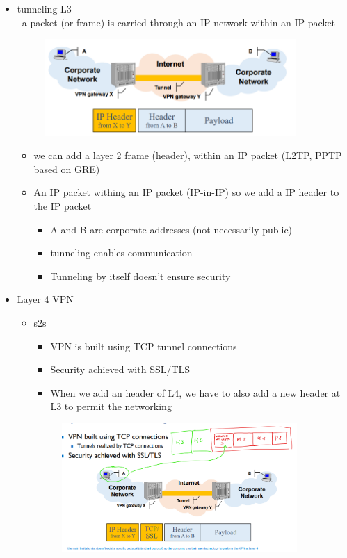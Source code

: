 \documentclass{article}
\begin{document}
\begin{itemize}
    \item tunneling L3 \\\
    a packet (or frame) is carried through an IP network within an IP packet 
    \begin{figure}[H]
        \centering
        \includegraphics[width=0.90\textwidth]{figure/IP_in_IP_tunnel.png}
    \end{figure}
    \begin{itemize}
        \item we can add a layer 2 frame (header), within an IP packet (L2TP, PPTP based on GRE)
        \item An IP packet withing an IP packet (IP-in-IP) so we add a IP header to the IP packet
        \begin{itemize}
            \item A and B are corporate addresses (not necessarily public)
            \item tunneling enables communication
            \item Tunneling by itself doesn't ensure security
        \end{itemize}
    \end{itemize}    
    \item Layer 4 VPN
    \begin{itemize}
        \item s2s
        \begin{itemize}
            \item VPN is built using TCP tunnel connections
            \item Security achieved with SSL/TLS
            \item When we add an header of L4, we have to also add a new header at L3 to permit the networking
        \end{itemize}
        \begin{figure}[H]
            \centering
            \includegraphics[width=0.90\textwidth]{figure/s2s_layer4.png}

\end{figure}
\end{itemize}
\end{itemize}
\end{document}
